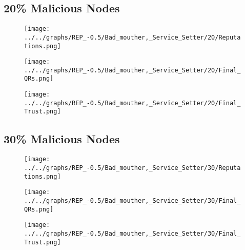 \begin{minipage}[t]{0.49\columnwidth}
\subsection*{20\% Malicious Nodes}
    \begin{figure}[H]
        \centering
        \texttt{[image: ../../graphs/REP\_-0.5/Bad\_mouther,\_Service\_Setter/20/Reputations.png]}
    \end{figure}
    \begin{figure}[H]
        \centering
        \texttt{[image: ../../graphs/REP\_-0.5/Bad\_mouther,\_Service\_Setter/20/Final\_QRs.png]}
    \end{figure}
\end{minipage}
\begin{minipage}[t]{0.49\columnwidth}
    \begin{figure}[H]
        \centering
        \texttt{[image: ../../graphs/REP\_-0.5/Bad\_mouther,\_Service\_Setter/20/Final\_Trust.png]}
    \end{figure}
\end{minipage}

\begin{minipage}[t]{0.49\columnwidth}
\subsection*{30\% Malicious Nodes}
    \begin{figure}[H]
        \centering
        \texttt{[image: ../../graphs/REP\_-0.5/Bad\_mouther,\_Service\_Setter/30/Reputations.png]}
    \end{figure}
    \begin{figure}[H]
        \centering
        \texttt{[image: ../../graphs/REP\_-0.5/Bad\_mouther,\_Service\_Setter/30/Final\_QRs.png]}
    \end{figure}
\end{minipage}
\begin{minipage}[t]{0.49\columnwidth}
    \begin{figure}[H]
        \centering
        \texttt{[image: ../../graphs/REP\_-0.5/Bad\_mouther,\_Service\_Setter/30/Final\_Trust.png]}
    \end{figure}
\end{minipage}

